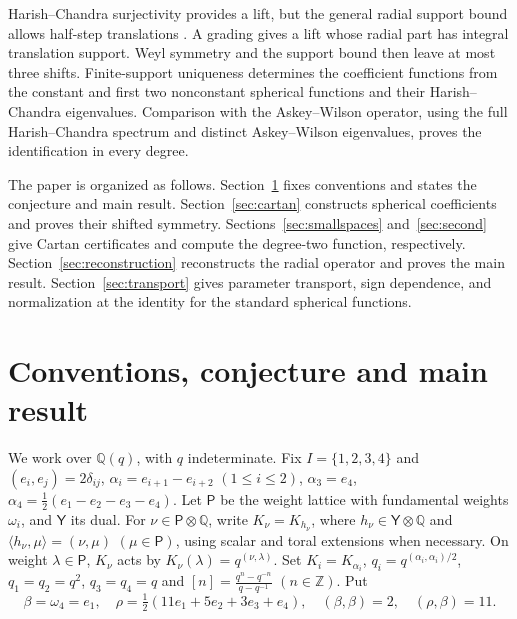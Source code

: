 \documentclass[12pt,reqno]{amsart}
\theoremstyle{plain}
\theoremstyle{definition}
\numberwithin{equation}{section}
\newcommand{\kk}{\mathbb Q(q)}
\begin{document}
Harish--Chandra surjectivity provides a lift, but the general
radial support bound allows half-step translations \cite{Sch26}.
A grading gives a lift whose radial part has integral translation
support. Weyl symmetry and the support bound then leave at most
three shifts.
Finite-support uniqueness determines the coefficient functions
from the constant and first two nonconstant spherical functions
and their Harish--Chandra eigenvalues.
Comparison with the Askey--Wilson operator, using the full
Harish--Chandra spectrum and distinct Askey--Wilson eigenvalues,
proves the identification in every degree.

The paper is organized as follows.
Section~\ref{sec:conventions} fixes conventions and states the conjecture and main result.
Section~\ref{sec:cartan} constructs spherical coefficients and
proves their shifted symmetry.
Sections~\ref{sec:smallspaces} and~\ref{sec:second} give Cartan
certificates and compute the degree-two function, respectively.
Section~\ref{sec:reconstruction} reconstructs the radial operator
and proves the main result.
Section~\ref{sec:transport} gives parameter transport, sign
dependence, and normalization at the identity
for the standard spherical functions.

\section{Conventions, conjecture and main result}
\label{sec:conventions}
We work over $\kk$, with $q$ indeterminate. Fix $I=\{1,2,3,4\}$ and $(e_i,e_j)=2\delta_{ij}$, $\alpha_i=e_{i+1}-e_{i+2}$ $(1\leq i\leq 2)$, $\alpha_3=e_4$, $\alpha_4=\tfrac12(e_1-e_2-e_3-e_4)$.
Let $\mathsf P$ be the weight lattice with fundamental weights
$\omega_i$, and $\mathsf Y$ its dual. For
$\nu\in\mathsf P\otimes\mathbb Q$, write $K_\nu=K_{h_\nu}$,
where $h_\nu\in\mathsf Y\otimes\mathbb Q$ and
$\langle h_\nu,\mu\rangle=(\nu,\mu)$ $(\mu\in\mathsf P)$,
using scalar and toral extensions when necessary.
On weight $\lambda\in\mathsf P$, $K_\nu$ acts by
$K_\nu(\lambda)=q^{(\nu,\lambda)}$.
Set $K_i=K_{\alpha_i}$, $q_i=q^{(\alpha_i,\alpha_i)/2}$, $q_1=q_2=q^2$, $q_3=q_4=q$ and $[n]=\frac{q^n-q^{-n}}{q-q^{-1}}$ $(n\in\mathbb Z)$.
Put
\[
\beta=\omega_4=e_1,\quad
\rho=\tfrac12(11e_1+5e_2+3e_3+e_4),\quad
(\beta,\beta)=2,\quad(\rho,\beta)=11.
\]
\end{document}
